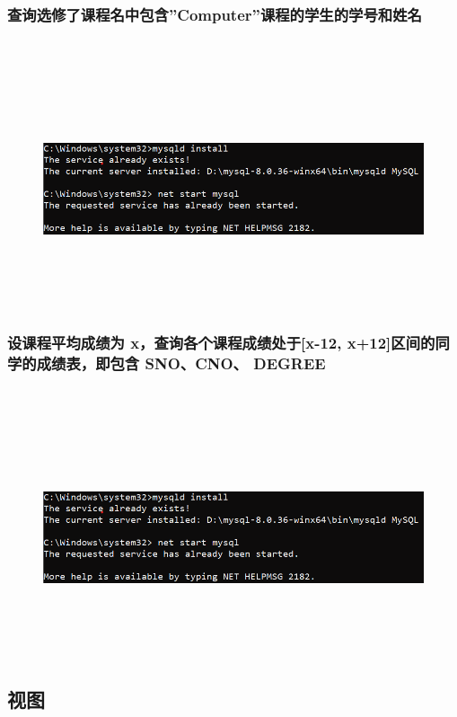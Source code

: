 \documentclass{ctexart}
\begin{document}
\subsubsection{查询选修了课程名中包含”Computer”课程的学生的学号和姓名}
\begin{lstlisting}[language=sql]
	
\end{lstlisting}
\begin{figure}[H]
	\centering 
	\includegraphics[height=7cm,width=14cm]{1.png}
	\end{figure}
\subsubsection{设课程平均成绩为 x，查询各个课程成绩处于[x-12, x+12]区间的同学的成绩表，即包含 SNO、CNO、 DEGREE}
\begin{lstlisting}[language=sql]
	
\end{lstlisting}
\begin{figure}[H]
	\centering 
	\includegraphics[height=7cm,width=14cm]{1.png}
	\end{figure}
\subsection{视图}
\end{document}
